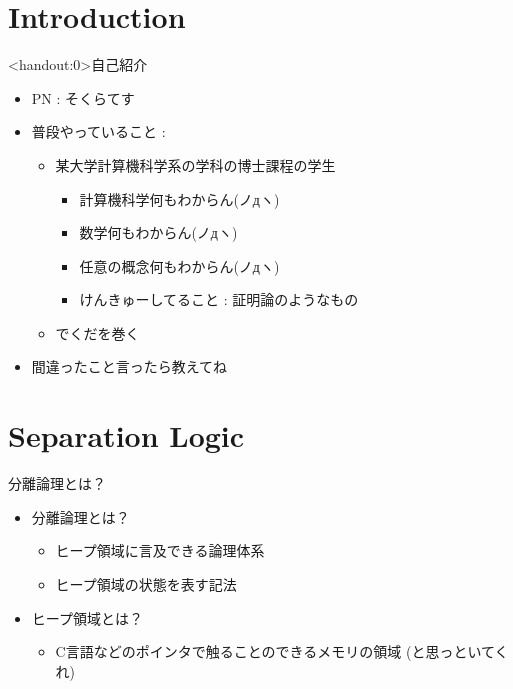 \documentclass[notheorems, aspectratio=169, 12pt, unicode]{beamer}
\begin{document}
\begin{frame}
 \titlepage
\end{frame}

 \section{Introduction}
 
 \begin{frame}<handout:0>{自己紹介}
  \begin{itemize}
   \item PN : そくらてす
   \item 普段やっていること : \pause
	 \begin{itemize}
	  \item 某大学計算機科学系の学科の博士課程の学生
		\begin{itemize}
		 \item \alert{計算機科学何もわからん(ノдヽ)} \pause
		 \item \alert{数学何もわからん(ノдヽ)} \pause
		 \item \alert{任意の概念何もわからん(ノдヽ)} \pause
		 \item けんきゅーしてること : 証明論のようなもの \pause
		\end{itemize}
	  \item {} でくだを巻く \pause 
	 \end{itemize}
   \item 間違ったこと言ったら教えてね
  \end{itemize} 
 \end{frame}
 
 \section{Separation Logic}

 \begin{frame}{分離論理とは？}
  \begin{itemize}
   \item \alert{分離論理}とは？ \pause
	 \begin{itemize}
	  \item \alert{ヒープ領域}に言及できる論理体系
	  \item \alert{ヒープ領域}の状態を表す記法 \pause
	 \end{itemize}
   \item \alert{ヒープ領域}とは？ \pause
	 \begin{itemize}
	  \item C言語などの\alert{ポインタ}で触ることのできるメモリの領域 \pause
		(と思っといてくれ) 
	 \end{itemize}
  \end{itemize} 
 \end{frame}
\end{document}
